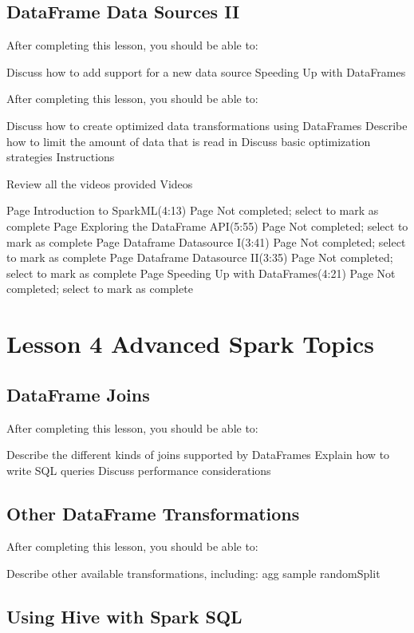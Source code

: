 \subsection{DataFrame Data Sources II}

After completing this lesson, you should be able to:

Discuss how to add support for a new data source
Speeding Up with DataFrames

After completing this lesson, you should be able to:

Discuss how to create optimized data transformations using DataFrames
Describe how to limit the amount of data that is read in
Discuss basic optimization strategies
Instructions

Review all the videos provided
Videos

Page Introduction to SparkML(4:13) Page Not completed; select to mark as complete
Page Exploring the DataFrame API(5:55) Page Not completed; select to mark as complete
Page Dataframe Datasource I(3:41) Page Not completed; select to mark as complete
Page Dataframe Datasource II(3:35) Page Not completed; select to mark as complete
Page Speeding Up with DataFrames(4:21) Page Not completed; select to mark as complete


\newpage
\section{Lesson 4 Advanced Spark Topics}

\subsection{DataFrame Joins}

After completing this lesson, you should be able to:

Describe the different kinds of joins supported by DataFrames
Explain how to write SQL queries
Discuss performance considerations

\subsection{Other DataFrame Transformations}

After completing this lesson, you should be able to:

Describe other available transformations, including:
agg
sample
randomSplit

\subsection{Using Hive with Spark SQL}


